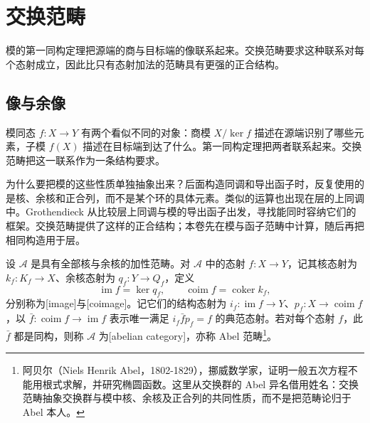 
\section{交换范畴}
\label{b4:sec:0402}

模的第一同构定理把源端的商与目标端的像联系起来。交换范畴要求这种联系对每个态射成立，因此比只有态射加法的范畴具有更强的正合结构。

%
%

\subsection{像与余像}
\label{b4:subsec:0402:01}

模同态 \(f:X\to Y\) 有两个看似不同的对象：商模 \(X/\ker f\) 描述在源端识别了哪些元素，子模 \(f(X)\) 描述在目标端到达了什么。第一同构定理把两者联系起来。交换范畴把这一联系作为一条结构要求。

\ProseParagraphBreak
为什么要把模的这些性质单独抽象出来？后面构造同调和导出函子时，反复使用的是核、余核和正合列，而不是某个环的具体元素。类似的运算也出现在层的上同调中。Grothendieck 从比较层上同调与模的导出函子出发，寻找能同时容纳它们的框架。交换范畴提供了这样的正合结构；本卷先在模与函子范畴中计算，随后再把相同构造用于层。

\begin{definition}\label{b4:def:abelian-category}
	设 \(\mathcal A\) 是具有全部核与余核的加性范畴。对 \(\mathcal A\) 中的态射 \(f:X\to Y\)，记其核态射为 \(k_f:K_f\to X\)、余核态射为 \(q_f:Y\to Q_f\)，定义
	\[
		\operatorname{im}f=\ker q_f,\qquad \operatorname{coim}f=\operatorname{coker}k_f,
	\]
	分别称为[image]与[coimage]。记它们的结构态射为 \(i_f:\operatorname{im}f\to Y\)、\(p_f:X\to\operatorname{coim}f\)，以 \(\bar f:\operatorname{coim}f\to\operatorname{im}f\) 表示唯一满足 \(i_f\bar f p_f=f\) 的典范态射。若对每个态射 \(f\)，此 \(\bar f\) 都是同构，则称 \(\mathcal A\) 为[abelian category]，亦称 Abel 范畴\footnote{阿贝尔（Niels Henrik Abel，1802-1829），挪威数学家，证明一般五次方程不能用根式求解，并研究椭圆函数。这里从交换群的 Abel 异名借用姓名：交换范畴抽象交换群与模中核、余核及正合列的共同性质，而不是把范畴论归于 Abel 本人。}。
\end{definition}

